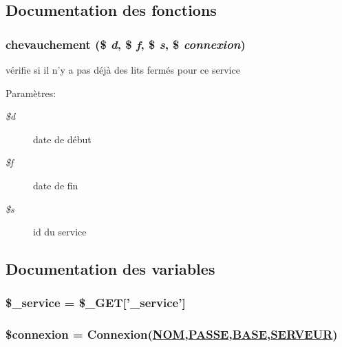 \subsection{Documentation des fonctions}
\hypertarget{lits__fermes__enregistre_8php_a10}{
\subsubsection[chevauchement]{\setlength{\rightskip}{0pt plus 5cm}chevauchement (\$ {\em d}, \$ {\em f}, \$ {\em s}, \$ {\em connexion})}}
\label{lits__fermes__enregistre_8php_a10}


v\'{e}rifie si il n'y a pas d\'{e}j\`{a} des lits ferm\'{e}s pour ce service \begin{Desc}
\item[Param\`{e}tres:]
\begin{description}
\item[{\em \$d}]date de d\'{e}but \item[{\em \$f}]date de fin \item[{\em \$s}]id du service \end{description}
\end{Desc}


\subsection{Documentation des variables}
\hypertarget{lits__fermes__enregistre_8php_a4}{
\subsubsection[\$\_\-service]{\setlength{\rightskip}{0pt plus 5cm}\$\_\-service = \$\_\-GET\mbox{[}'\_\-service'\mbox{]}}}
\label{lits__fermes__enregistre_8php_a4}


\hypertarget{lits__fermes__enregistre_8php_a0}{
\subsubsection[\$connexion]{\setlength{\rightskip}{0pt plus 5cm}\$connexion = Connexion(\hyperlink{pma__connect_8php_a0}{NOM},\hyperlink{pma__connect_8php_a1}{PASSE},\hyperlink{pma__connect_8php_a3}{BASE},\hyperlink{pma__connect_8php_a2}{SERVEUR})}}
\label{lits__fermes__enregistre_8php_a0}


